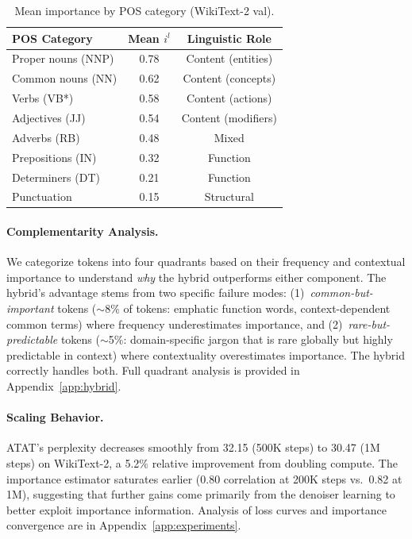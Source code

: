 \documentclass[11pt]{article}
\theoremstyle{remark}
\begin{document}
\begin{table}[t]
\centering
\caption{Mean importance by POS category (WikiText-2 val).}
\label{tab:pos-importance}
\small
\begin{tabular}{lcc}
\toprule
\textbf{POS Category} & \textbf{Mean $i^l$} & \textbf{Linguistic Role} \\
\midrule
Proper nouns (NNP) & 0.78 & Content (entities) \\
Common nouns (NN) & 0.62 & Content (concepts) \\
Verbs (VB*) & 0.58 & Content (actions) \\
Adjectives (JJ) & 0.54 & Content (modifiers) \\
Adverbs (RB) & 0.48 & Mixed \\
Prepositions (IN) & 0.32 & Function \\
Determiners (DT) & 0.21 & Function \\
Punctuation & 0.15 & Structural \\
\bottomrule
\end{tabular}
\end{table}



\paragraph{Complementarity Analysis.} We categorize tokens into four quadrants based on their frequency and contextual importance to understand \textit{why} the hybrid outperforms either component. The hybrid's advantage stems from two specific failure modes: (1)~\textit{common-but-important} tokens ($\sim$8\% of tokens: emphatic function words, context-dependent common terms) where frequency underestimates importance, and (2)~\textit{rare-but-predictable} tokens ($\sim$5\%: domain-specific jargon that is rare globally but highly predictable in context) where contextuality overestimates importance. The hybrid correctly handles both. Full quadrant analysis is provided in Appendix~\ref{app:hybrid}.

\paragraph{Scaling Behavior.} ATAT's perplexity decreases smoothly from 32.15 (500K steps) to 30.47 (1M steps) on WikiText-2, a 5.2\% relative improvement from doubling compute. The importance estimator saturates earlier (0.80 correlation at 200K steps vs.\ 0.82 at 1M), suggesting that further gains come primarily from the denoiser learning to better exploit importance information. Analysis of loss curves and importance convergence are in Appendix~\ref{app:experiments}.
\end{document}
